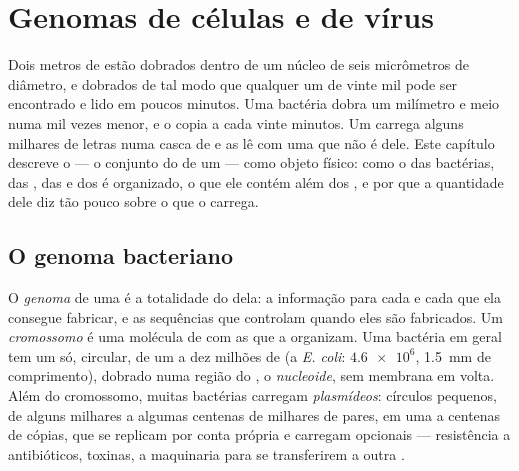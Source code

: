 \chapter{Genomas de células e de vírus}\label{ch:b1:genomes}

Dois metros de  estão dobrados dentro de um núcleo de seis
micrômetros de diâmetro, e dobrados de tal modo que qualquer um de vinte
mil  pode ser encontrado e lido em poucos minutos. Uma bactéria
dobra um milímetro e meio numa  mil vezes menor, e o copia a cada
vinte minutos. Um  carrega alguns milhares de letras numa casca de
 e as lê com uma  que não é dele. Este capítulo descreve o
\emph{} --- o conjunto do  de um  --- como objeto
físico: como o  das bactérias, das , das
 e dos  é organizado, o que ele contém além dos , e
por que a quantidade dele diz tão pouco sobre o  que o carrega.

\section{O genoma bacteriano}

\begin{definition}\label{def:b1:genomes:genome}
O \emph{genoma} de uma  é a totalidade do  dela:
a informação para cada  e cada  que ela consegue fabricar, e
as sequências que controlam quando eles são fabricados. Um
\emph{cromossomo} é uma molécula de  com as
 que a organizam. Uma bactéria em geral tem um só, circular, de
um a dez milhões de  (a \emph{E. coli}: $\num{4.6e6}$,
\qty{1.5}{mm} de comprimento), dobrado numa região do , o
\emph{nucleoide}, sem membrana em volta. Além do
cromossomo, muitas bactérias carregam
\emph{plasmídeos}: círculos pequenos, de alguns
milhares a algumas centenas de milhares de pares, em uma a centenas de
cópias, que se replicam por conta própria e carregam  opcionais ---
resistência a antibióticos, toxinas, a maquinaria para se transferirem a
outra .
\end{definition}

